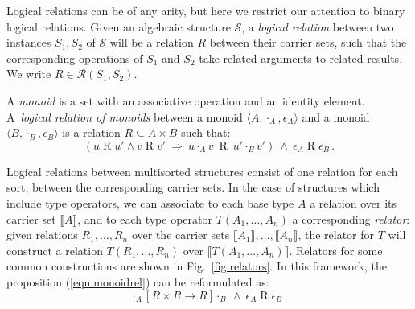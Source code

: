 \documentclass[acmsmall,authordraft]{acmart}
\newcommand{\ifr}[1]{\mathrel{[{#1}]}}
\begin{document}
Logical relations can be of any arity,
but here
we restrict our attention to
binary logical relations.
Given an algebraic structure $\mathcal{S}$,
a \emph{logical relation}
between two instances $S_1, S_2$ of $\mathcal{S}$
will be a relation $R$
between their carrier sets,
such that the corresponding operations of $S_1$ and $S_2$
take related arguments to related results.
We write $R \in \mathcal{R}(S_1, S_2)$.

\begin{example}
\label{ex:monoid}
A \emph{monoid} is a set with
an associative operation and
an identity element.
A~\emph{logical relation of monoids} between
a monoid $\langle A, \cdot_A, \epsilon_A \rangle$ and
a monoid $\langle B, \cdot_B, \epsilon_B \rangle$
is a relation $R \subseteq A \times B$
such that:
\begin{equation}
\label{eqn:monoidrel}
(u \mathrel{R} u' \wedge v \mathrel{R} v' \: \Rightarrow \:
 u \cdot_A v \: \mathrel{R} \: u' \cdot_B v')
\: \wedge \:
\epsilon_A \mathrel{R} \epsilon_B \,.
\end{equation}
\end{example}

Logical relations between multisorted structures
consist of one relation for each sort,
between the corresponding carrier sets.
In the case of structures which include type operators,
we can associate to each base type $A$
a relation over its carrier set $\llbracket A \rrbracket$,
and to each type operator $T(A_1, \ldots, A_n)$
a corresponding \emph{relator}:
given relations $R_1, \ldots, R_n$ over
the carrier sets $\llbracket A_1 \rrbracket, \ldots, \llbracket A_n \rrbracket$,
the relator for $T$
will construct a relation $T(R_1, \ldots, R_n)$
over $\llbracket T(A_1, \ldots, A_n) \rrbracket$.
Relators for some common constructions are shown in Fig.~\ref{fig:relators}.
In this framework, the proposition (\ref{eqn:monoidrel}) can be reformulated as:
\[
  \cdot_A \ifr{R \times R \rightarrow R} \cdot_B
  \: \wedge \:
  \epsilon_A \mathrel{R} \epsilon_B \,.
\]
\end{document}
